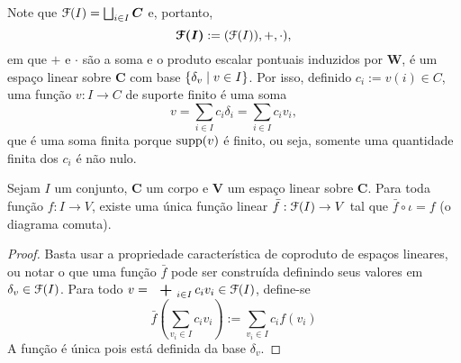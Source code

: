 Note que $\mathcal{F}(I) = \bigsqcup_{i \in I} \bm C$ e, portanto,
	\begin{equation*}
	\bm{\mathcal{F}(I)} := (\mathcal{F}(I)),+,\cdot),
	\end{equation*}	
em que $+$ e $\cdot$ são a soma e o produto escalar pontuais induzidos por $\bm W$, é um espaço linear sobre $\bm C$ com base $\left\{{\delta_v}\;\middle\vert\;{v \in I}\right\}$. Por isso, definido $c_i := v(i) \in C$, uma função $v: I \to C$ de suporte finito é uma soma
	\begin{equation*}
	v = \sum_{i \in I} c_i \delta_i = \sum_{i \in I} c_i v_i,
	\end{equation*}
que é uma soma finita porque $\operatorname{supp}(v)$ é finito, ou seja, somente uma quantidade finita dos $c_i$ é não nulo.

\begin{proposition}
Sejam $I$ um conjunto, $\bm C$ um corpo e $\bm V$ um espaço linear sobre $\bm C$. Para toda função $f: I \to V$, existe uma única função linear $\bar f: \mathcal{F}(I) \to V$ tal que $\bar f \circ \iota = f$ (o diagrama comuta).
\begin{figure}
\centering
{}
\end{figure}
\end{proposition}
\begin{proof} Basta usar a propriedade característica de coproduto de espaços lineares, ou notar o que uma função $\bar f$ pode ser construída definindo seus valores em $\delta_v \in \mathcal{F}(I)$. Para todo $v=\sum_{i \in I} c_i v_i \in \liv(I)$, define-se
	\begin{equation*}
	\bar f\left(\sum_{v_i \in I} c_i v_i\right):= \sum_{v_i \in I} c_i f(v_i)
	\end{equation*}
A função é única pois está definida da base $\delta_v$.
\end{proof}


